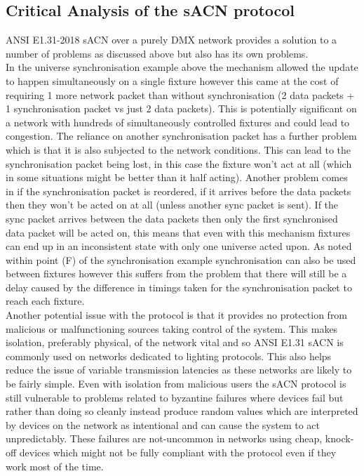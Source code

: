 \documentclass[11pt,a4paper]{article}
\begin{document}
\subsection{Critical Analysis of the sACN protocol}
ANSI E1.31-2018 sACN over a purely DMX network provides a solution to a number of problems as discussed above but also has its own problems.\\

In the universe synchronisation example above the mechanism allowed the update to happen simultaneously on a single fixture however this came at the cost of requiring 1 more network packet than without synchronisation (2 data packets + 1 synchronisation packet vs just 2 data packets). This is potentially significant on a network with hundreds of simultaneously controlled fixtures and could lead to congestion. The reliance on another synchronisation packet has a further problem which is that it is also subjected to the network conditions. This can lead to the synchronisation packet being lost, in this case the fixture won't act at all (which in some situations might be better than it half acting). Another problem comes in if the synchronisation packet is reordered, if it arrives before the data packets then they won't be acted on at all (unless another sync packet is sent). If the sync packet arrives between the data packets then only the first synchronised data packet will be acted on, this means that even with this mechanism fixtures can end up in an inconsistent state with only one universe acted upon. As noted within point (F) of the synchronisation example synchronisation can also be used between fixtures however this suffers from the problem that there will still be a delay caused by the difference in timings taken for the synchronisation packet to reach each fixture.\\

Another potential issue with the protocol is that it provides no protection from malicious or malfunctioning sources taking control of the system. This makes isolation, preferably physical, of the network vital and so ANSI E1.31 sACN is commonly used on networks dedicated to lighting protocols. This also helps reduce the issue of variable transmission latencies as these networks are likely to be fairly simple. Even with isolation from malicious users the sACN protocol is still vulnerable to problems related to byzantine failures where devices fail but rather than doing so cleanly instead produce random values which are interpreted by devices on the network as intentional and can cause the system to act unpredictably. These failures are not-uncommon in networks using cheap, knock-off devices which might not be fully compliant with the protocol even if they work most of the time.\\
\end{document}
